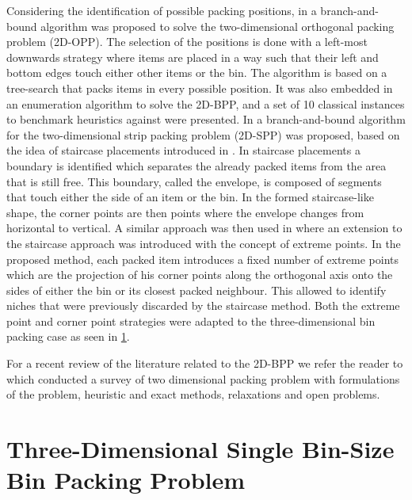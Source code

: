 Considering the identification of possible packing positions, in \citep{Martello1998} a branch-and-bound algorithm was proposed to solve the two-dimensional orthogonal packing problem (2D-OPP).
The selection of the positions is done with a left-most downwards strategy where items are placed in a way such that their left and bottom edges touch either other items or the bin.
The algorithm is based on a tree-search that packs items in every possible position.
It was also embedded in an enumeration algorithm to solve the 2D-BPP, and a set of 10 classical instances to benchmark heuristics against were presented.
In \citep{martello2003exact} a branch-and-bound algorithm for the two-dimensional strip packing problem (2D-SPP) was proposed, based on the idea of staircase placements introduced in \citep{scheithauer1995equivalence}.
In staircase placements a boundary is identified which separates the already packed items from the area that is still free.
This boundary, called the envelope, is composed of segments that touch either the side of an item or the bin.
In the formed staircase-like shape, the corner points are then points where the envelope changes from horizontal to vertical.
A similar approach was then used in \citep{crainic2008extreme} where an extension to the staircase approach was introduced with the concept of extreme points.
In the proposed method, each packed item introduces a fixed number of extreme points which are the projection of his corner points along the orthogonal axis onto the sides of either the bin or its closest packed neighbour.
This allowed to identify niches that were previously discarded by the staircase method.
Both the extreme point and corner point strategies were adapted to the three-dimensional bin packing case as seen in \cref{sec:literature:3dbpp}.

For a recent review of the literature related to the 2D-BPP we refer the reader to \citep{IORI2021399} which conducted a survey of two dimensional packing problem with formulations of the problem, heuristic and exact methods, relaxations and open problems.

\section{Three-Dimensional Single Bin-Size Bin Packing Problem}
\label{sec:literature:3dbpp}%

